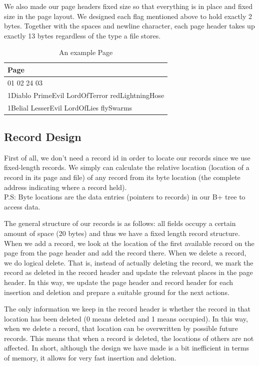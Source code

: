 \documentclass{article}
\begin{document}
We also made our page headers fixed size so that everything is in place and fixed size in the page layout. We designed each flag mentioned above to hold exactly 2 bytes. Together with the spaces and newline character, each page header takes up exactly 13 bytes regardless of the type a file stores.



\begin{table}[H]
\centering
\begin{tabular}{|l|}
\hline
\textbf{\hspace{3.2cm} Page} \\
\hline
{01 02 24 03} \\
\hline
{1Diablo              PrimeEvil           LordOfTerror        redLightningHose   } \\
{1Belial              LesserEvil          LordOfLies          flySwarms          } \\
\hline
\end{tabular}
\label{tab:ex}
\caption{An example Page}
\end{table}


\subsection{Record Design}
\label{recorddesign}
First of all, we don't need a record id in order to locate our records since we use fixed-length records. We simply can calculate the relative location (location of a record in its page and file) of any record from its byte location (the complete address indicating where a record held). \\
P.S: Byte locations are the data entries (pointers to records) in our B+ tree to access data.

The general structure of our records is as follows: all fields occupy a certain amount of space (20 bytes) and thus we have a fixed length record structure. When we add a record, we look at the location of the first available record on the page from the page header and add the record there. When we delete a record, we do logical delete. That is, instead of actually deleting the record, we mark the record as deleted in the record header and update the relevant places in the page header. In this way, we update the page header and record header for each insertion and deletion and prepare a suitable ground for the next actions. 

The only information we keep in the record header is whether the record in that location has been deleted (0 means deleted and 1 means occupied). In this way, when we delete a record, that location can be overwritten by possible future records. This means that when a record is deleted, the locations of others are not affected. In short, although the design we have made is a bit inefficient in terms of memory, it allows for very fast insertion and deletion. 
\end{document}
